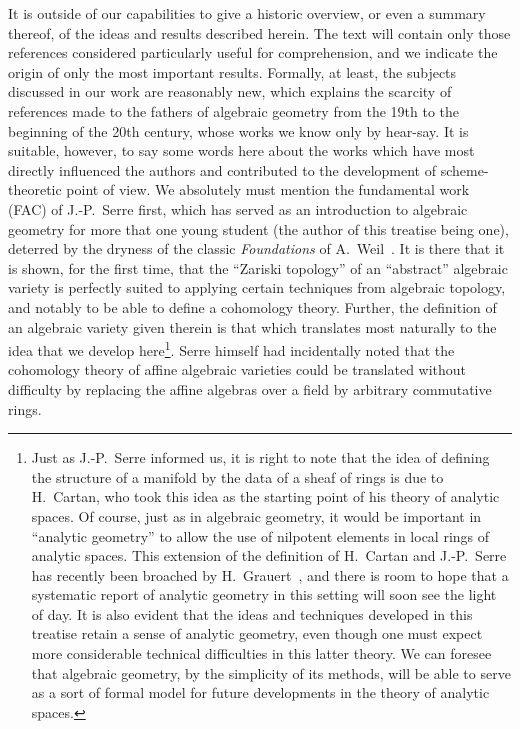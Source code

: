 \documentclass[openany,oneside]{amsbook}
\theoremstyle{ega-env-style}
\theoremstyle{ega-thm-env-style}
\theoremstyle{ega-defn-env-style}
\begin{document}
It is outside of our capabilities to give a historic overview, or even a summary thereof, of the ideas and results described herein.
The text will contain only those references considered particularly useful for comprehension, and we indicate the origin of only the most important results.
Formally, at least, the subjects discussed in our work are reasonably new, which explains the scarcity of references made to the fathers of algebraic geometry from the 19th to the beginning of the 20th century, whose works we know only by hear-say.
It is suitable, however, to say some words here about the works which have most directly influenced the authors and contributed to the development of scheme-theoretic point of view.
We absolutely must mention the fundamental work (FAC) of J.-P.~Serre first, which has served as an introduction to algebraic geometry for more that one young student (the author of this treatise being one), deterred by the dryness of the classic \emph{Foundations} of A.~Weil~\cite{I-18}.
It is there that it is shown, for the first time, that the ``Zariski topology'' of an ``abstract'' algebraic variety is perfectly suited to applying certain techniques from algebraic topology, and notably to be able to define a cohomology theory.
Further, the definition of an algebraic variety given therein is that which translates most naturally to the idea that we develop here\footnote{Just as J.-P.~Serre informed us, it is right to note that the idea of defining the structure of a manifold by the data of a sheaf of rings is due to H.~Cartan, who took this idea as the starting point of his theory of analytic spaces.
Of course, just as in algebraic geometry, it would be important in ``analytic geometry'' to allow the use of nilpotent elements in local rings of analytic spaces.
This extension of the definition of H.~Cartan and J.-P.~Serre has recently been broached by H.~Grauert~\cite{I-5}, and there is room to hope that a systematic report of analytic geometry in this setting will soon see the light of day.
It is also evident that the ideas and techniques developed in this treatise retain a sense of analytic geometry, even though one must expect more considerable technical difficulties in this latter theory.
We can foresee that algebraic geometry, by the simplicity of its methods, will be able to serve as a sort of formal model for future developments in the theory of analytic spaces.}.
Serre himself had incidentally noted that the cohomology theory of affine algebraic varieties could be translated without difficulty by replacing the affine algebras over a field by arbitrary commutative rings.
\end{document}
